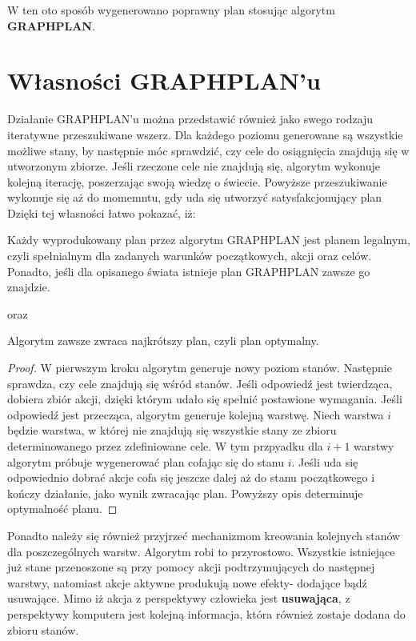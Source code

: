     W ten oto sposób wygenerowano poprawny plan stosując algorytm \textbf{GRAPHPLAN}.

\section{Własności GRAPHPLAN'u}
    Działanie GRAPHPLAN'u można przedstawić również jako swego rodzaju iteratywne przeszukiwane wszerz. 
    Dla każdego poziomu generowane są wszystkie możliwe stany, by następnie móc sprawdzić, czy cele do osiągnięcia 
    znajdują się w utworzonym zbiorze. Jeśli rzeczone cele nie znajdują się, algorytm wykonuje kolejną iterację, 
    poszerzając swoją wiedzę o świecie. Powyższe przeszukiwanie wykonuje się aż do momemntu, gdy uda się utworzyć satysfakcjonujący plan
    Dzięki tej własności łatwo pokazać, iż:
    \begin{theorem}
        Każdy wyprodukowany plan przez algorytm GRAPHPLAN jest planem legalnym, czyli spełnialnym dla zadanych 
        warunków początkowych, akcji oraz celów. Ponadto, jeśli dla opisanego świata istnieje plan GRAPHPLAN zawsze go znajdzie.
    \end{theorem}
    oraz
    \begin{theorem}
        Algorytm zawsze zwraca najkrótszy plan, czyli plan optymalny.
    \end{theorem}

    \begin{proof}
        W pierwszym kroku algorytm generuje nowy poziom stanów. Następnie sprawdza, czy cele znajdują się wśród stanów. Jeśli odpowiedź jest twierdząca,
        dobiera zbiór akcji, dzięki którym udało się spełnić postawione wymagania. Jeśli odpowiedź jest przecząca, algorytm generuje kolejną warstwę.
        Niech warstwa $i$ będzie warstwa, w której nie znajdują się wszystkie stany ze zbioru determinowanego przez zdefiniowane cele. W tym przpyadku
        dla $i+1$ warstwy algorytm próbuje wygenerować plan cofając się do stanu $i$. Jeśli uda się odpowiednio dobrać akcje 
        cofa się jeszcze dalej aż do stanu początkowego i kończy działanie, jako wynik zwracając plan. Powyższy opis determinuje optymalność planu.
    \end{proof}


    Ponadto należy się również przyjrzeć mechanizmom kreowania kolejnych stanów dla poszczególnych warstw. Algorytm robi to przyrostowo. 
    Wszystkie istniejące już stane przenoszone są przy pomocy akcji podtrzymujących do następnej warstwy, natomiast akcje aktywne produkują 
    nowe efekty- dodające bądź usuwające. Mimo iż akcja z perspektywy człowieka jest \textbf{usuwająca}, 
    z perspektywy komputera jest kolejną informacja, która również zostaje dodana do zbioru stanów.

